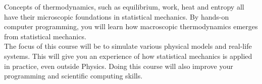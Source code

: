 \documentclass[12pt]{mcplain}
\begin{document}
Concepts of thermodynamics, such as equilibrium, work, heat and entropy all have their microscopic foundations in statistical mechanics. By hands-on computer programming, you will learn how macroscopic thermodynamics emerges from statistical mechanics.\\

The focus of this course will be to simulate various physical models and real-life systems. This will give you an experience of how statistical mechanics is applied in practice, even outside Physics. Doing this course will also improve your programming and scientific computing skills.







\end{document}
